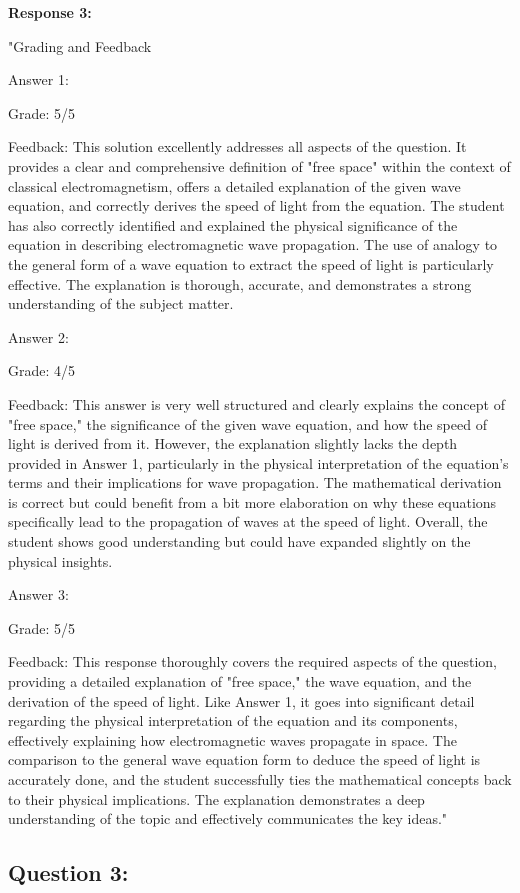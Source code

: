 \documentclass[a4paper,11pt]{article}
\begin{document}
\textbf{Response 3:}

"Grading and Feedback

Answer 1:

Grade: 5/5

Feedback: This solution excellently addresses all aspects of the question. It provides a clear and comprehensive definition of "free space" within the context of classical electromagnetism, offers a detailed explanation of the given wave equation, and correctly derives the speed of light from the equation. The student has also correctly identified and explained the physical significance of the equation in describing electromagnetic wave propagation. The use of analogy to the general form of a wave equation to extract the speed of light is particularly effective. The explanation is thorough, accurate, and demonstrates a strong understanding of the subject matter.

Answer 2:

Grade: 4/5

Feedback: This answer is very well structured and clearly explains the concept of "free space," the significance of the given wave equation, and how the speed of light is derived from it. However, the explanation slightly lacks the depth provided in Answer 1, particularly in the physical interpretation of the equation's terms and their implications for wave propagation. The mathematical derivation is correct but could benefit from a bit more elaboration on why these equations specifically lead to the propagation of waves at the speed of light. Overall, the student shows good understanding but could have expanded slightly on the physical insights.

Answer 3:

Grade: 5/5

Feedback: This response thoroughly covers the required aspects of the question, providing a detailed explanation of "free space," the wave equation, and the derivation of the speed of light. Like Answer 1, it goes into significant detail regarding the physical interpretation of the equation and its components, effectively explaining how electromagnetic waves propagate in space. The comparison to the general wave equation form to deduce the speed of light is accurately done, and the student successfully ties the mathematical concepts back to their physical implications. The explanation demonstrates a deep understanding of the topic and effectively communicates the key ideas."

\subsection*{Question 3:}
\end{document}
